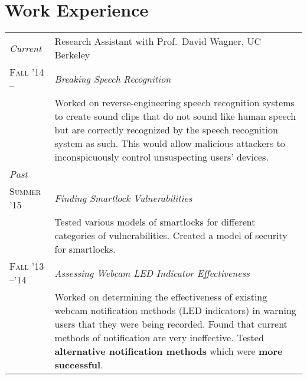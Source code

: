 \documentclass[letter,10pt]{article}
\begin{document}
\section{Work Experience}
\begin{tabular}{R{2.5cm}p{13cm}}
  \emph{Current}          & Research Assistant with Prof.\ David Wagner, UC Berkeley\\


  \textsc{Fall '14 --}     & \emph{Breaking Speech Recognition}\\

                          &\footnotesize{
                             Worked on reverse-engineering speech recognition
                             systems to create sound clips that do not sound
                             like human speech but are correctly recognized by
                             the speech recognition system as such. This would
                             allow malicious attackers to inconspicuously
                             control unsuspecting users’ devices.
                            }\\

  \emph{Past}             &\\
  \textsc{Summer '15}     & \emph{Finding Smartlock Vulnerabilities}\\

                          &\footnotesize{
                             Tested various models of smartlocks for different
                             categories of vulnerabilities. Created a model of
                             security for smartlocks.

                            }\\
  \textsc{Fall '13 --'14} & \emph{Assessing Webcam LED Indicator Effectiveness}\\

                          &\footnotesize{
                             Worked on determining the effectiveness of
                             existing webcam notification methods (LED
                             indicators) in warning users that they were being
                             recorded. Found that current methods of
                             notification are very ineffective. Tested
                             \textbf{alternative notification methods} which
                             were \textbf{more successful}.

                            }\\


\end{tabular}
\end{document}

